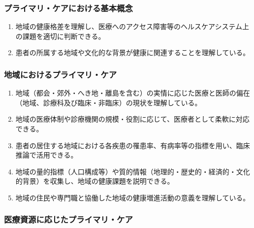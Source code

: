 \hypertarget{ux30d7ux30e9ux30a4ux30deux30eaux30b1ux30a2ux306bux304aux3051ux308bux57faux672cux6982ux5ff5}{%
\subsubsection{プライマリ・ケアにおける基本概念}\label{ux30d7ux30e9ux30a4ux30deux30eaux30b1ux30a2ux306bux304aux3051ux308bux57faux672cux6982ux5ff5}}

\begin{enumerate}
\def\labelenumi{\arabic{enumi}.}
\tightlist
\item
  地域の健康格差を理解し、医療へのアクセス障害等のヘルスケアシステム上の課題を適切に判断できる。
\item
  患者の所属する地域や文化的な背景が健康に関連することを理解している。
\end{enumerate}

\hypertarget{ux5730ux57dfux306bux304aux3051ux308bux30d7ux30e9ux30a4ux30deux30eaux30b1ux30a2}{%
\subsubsection{地域におけるプライマリ・ケア}\label{ux5730ux57dfux306bux304aux3051ux308bux30d7ux30e9ux30a4ux30deux30eaux30b1ux30a2}}

\begin{enumerate}
\def\labelenumi{\arabic{enumi}.}
\tightlist
\item
  地域（都会・郊外・へき地・離島を含む）の実情に応じた医療と医師の偏在（地域、診療科及び臨床・非臨床）の現状を理解している。
\item
  地域の医療体制や診療機関の規模・役割に応じて、医療者として柔軟に対応できる。
\item
  患者の居住する地域における各疾患の罹患率、有病率等の指標を用い、臨床推論で活用できる。
\item
  地域の量的指標（人口構成等）や質的情報（地理的・歴史的・経済的・文化的背景）を収集し、地域の健康課題を説明できる。
\item
  地域の住民や専門職と協働した地域の健康増進活動の意義を理解している。
\end{enumerate}

\hypertarget{ux533bux7642ux8cc7ux6e90ux306bux5fdcux3058ux305fux30d7ux30e9ux30a4ux30deux30eaux30b1ux30a2}{%
\subsubsection{医療資源に応じたプライマリ・ケア}\label{ux533bux7642ux8cc7ux6e90ux306bux5fdcux3058ux305fux30d7ux30e9ux30a4ux30deux30eaux30b1ux30a2}}

